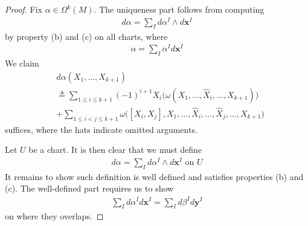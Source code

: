 \documentclass{report}
\begin{document}
\begin{proof}
  Fix $\alpha  \in \Omega^k(M)$. The uniqueness part follows from computing 
  \begin{align*}
  d\alpha =\sum_I d\alpha^I \wedge  d\textbf{x}^I 
  \end{align*}
by property (b) and (c) on all charts, where 
\begin{align*}
\alpha = \sum_I \alpha^I d\textbf{x}^I
\end{align*}
We claim 
\begin{align*}
&d\alpha (X_1,\dots ,X_{k+1})\\
&\triangleq \sum_{1\leq i\leq k+1}(-1)^{i+1}X_i \Big(\omega (X_1,\dots ,\widehat{X}_i,\dots ,X_{k+1}) \Big) \\
&+\sum_{1\leq i<j\leq k+1}\omega \Big( [X_i,X_j],X_1 ,\dots ,\widehat{X}_i,\dots ,\widehat{X}_j,\dots ,X_{k+1} \Big)
\end{align*}
suffices, where the hats indicate omitted arguments.  


Let $U$ be a chart. It is then clear that we must define 
\begin{align*}
d\alpha = \sum_I d\alpha^I \wedge   d\textbf{x}^I \text{ on }U
\end{align*}
It remains to show such definition is well defined and satisfies properties (b) and (c). The well-defined part requires us to show 
\begin{align*}
\sum_I d\alpha^I d\textbf{x}^I= \sum_I d\beta^I d\textbf{y}^I 
\end{align*}
on where they overlaps. 




\end{proof}
\end{document}
